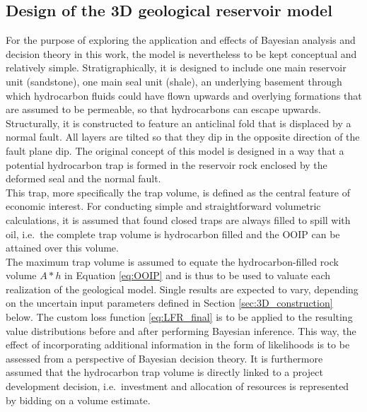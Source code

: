 		\subsection{Design of the 3D geological reservoir model}\label{sec:3D_design}
		For the purpose of exploring the application and effects of Bayesian analysis and decision theory in this work, the model is nevertheless to be kept conceptual and relatively simple. Stratigraphically, it is designed to include one main reservoir unit (sandstone), one main seal unit (shale), an underlying basement through which hydrocarbon fluids could have flown upwards and overlying formations that are assumed to be permeable, so that hydrocarbons can escape upwards. Structurally, it is constructed to feature an anticlinal fold that is displaced by a normal fault. All layers are tilted so that they dip in the opposite direction of the fault plane dip. The original concept of this model is designed in a way that a potential hydrocarbon trap is formed in the reservoir rock enclosed by the deformed seal and the normal fault.\\
		This trap, more specifically the trap volume, is defined as the central feature of economic interest. For conducting simple and straightforward volumetric calculations, it is assumed that found closed traps are always filled to spill with oil, i.e.\ the complete trap volume is hydrocarbon filled and the OOIP can be attained over this volume.\\
		The maximum trap volume is assumed to equate the hydrocarbon-filled rock volume $A * h$ in Equation \ref{eq:OOIP} and is thus to be used to valuate each realization of the geological model. Single results are expected to vary, depending on the uncertain input parameters defined in Section \ref{sec:3D_construction} below. The custom loss function \ref{eq:LFR_final} is to be applied to the resulting value distributions before and after performing Bayesian inference. This way, the effect of incorporating additional information in the form of likelihoods is to be assessed from a perspective of Bayesian decision theory. It is furthermore assumed that the hydrocarbon trap volume is directly linked to a project development decision, i.e.\ investment and allocation of resources is represented by bidding on a volume estimate.
		
